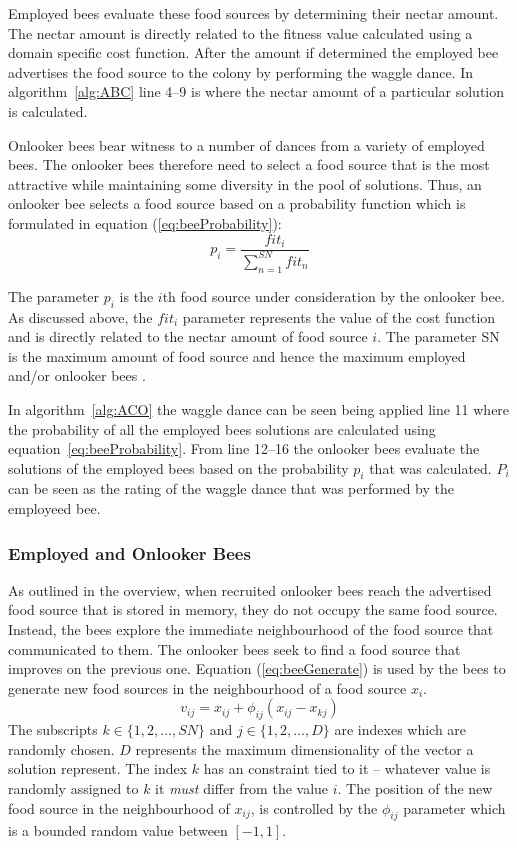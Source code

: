 Employed bees evaluate these food sources by determining their nectar amount. The nectar amount is directly related to the fitness value calculated using a domain specific cost function. After the amount if determined the employed bee advertises the food source to the colony by performing the waggle dance. In algorithm~\ref{alg:ABC} line 4--9 is where the nectar amount of a particular solution is calculated.

Onlooker bees bear witness to a number of dances from a variety of employed bees. The onlooker bees therefore need to select a food source that is the most attractive while maintaining some diversity in the pool of solutions. Thus, an onlooker bee selects a food source based on a probability function which is formulated in equation (\ref{eq:beeProbability})\cite{ABCCompareStudy}:
\begin{equation}
\label{eq:beeProbability}
p_i = \frac{{fit}_i}{\sum^{SN}_{n=1}{fit}_n}
\end{equation}

The parameter $p_i$ is the $i$th food source under consideration by the onlooker bee. As discussed above, the ${fit}_i$ parameter represents the value of the cost function and is directly related to the nectar amount of food source $i$. The parameter SN is the maximum amount of food source and hence the maximum employed and/or onlooker bees \cite{ABCCompareStudy}.

In algorithm~\ref{alg:ACO} the waggle dance can be seen being applied line 11 where the probability of all the employed bees solutions are calculated using equation~\ref{eq:beeProbability}. From line 12--16 the onlooker bees evaluate the solutions of the employed bees based on the probability $p_i$ that was calculated. $P_i$ can be seen as the rating of the waggle dance that was performed by the employeed bee.

\subsubsection{Employed and Onlooker Bees}
\label{sec:employonlookerbees}
As outlined in the overview, when recruited onlooker bees reach the advertised food source that is stored in memory, they do not occupy the same food source. Instead, the bees explore the immediate neighbourhood of the food source that communicated to them. The onlooker bees seek to find a food source that improves on the previous one. Equation (\ref{eq:beeGenerate}) is used by the bees to generate new food sources in the neighbourhood of a food source $x_i$.
\begin{equation}
\label{eq:beeGenerate}
v_{ij} = x_{ij} + \phi_{ij}(x_{ij} - x_{kj})
\end{equation}
The subscripts $k \in \{1,2,\dots,SN\}$ and $j \in \{1,2,\dots,D\}$ are indexes which are randomly chosen. $D$ represents the maximum dimensionality of the vector a solution represent. The index $k$ has an constraint tied to it -- whatever value is randomly assigned to $k$ it \emph{must} differ from the value $i$. The position of the new food source in the neighbourhood of $x_{ij}$, is controlled by the $\phi_{ij}$ parameter which is a bounded random value between $[-1,1]$. 

